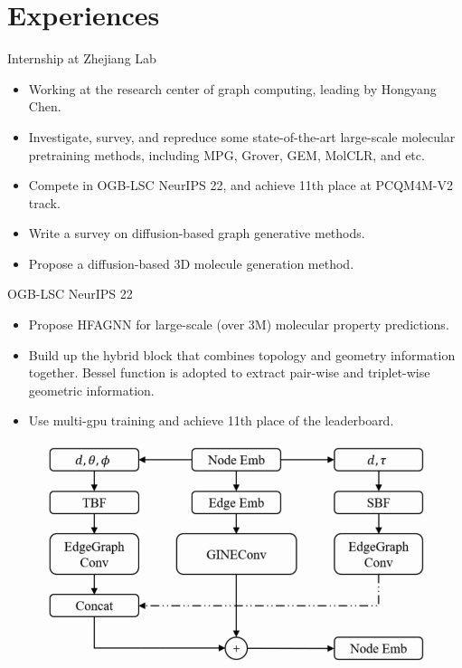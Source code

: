 \documentclass{beamer}
\begin{document}
\section{Experiences}
\begin{frame}{Internship at Zhejiang Lab}
    \begin{itemize}
        \item Working at the research center of graph computing, leading by Hongyang Chen.
        \item Investigate, survey, and repreduce some state-of-the-art large-scale molecular pretraining methods, including MPG, Grover, GEM, MolCLR, and etc.
        \item Compete in OGB-LSC NeurIPS 22, and achieve 11th place at PCQM4M-V2 track.
        \item Write a survey on diffusion-based graph generative methods.
        \item Propose a diffusion-based 3D molecule generation method.
    \end{itemize}
\end{frame}

\begin{frame}{OGB-LSC NeurIPS 22}
    \begin{itemize}
        \item Propose HFAGNN for large-scale (over 3M) molecular property predictions.
        \item Build up the hybrid block that combines topology and geometry information together. Bessel function is adopted to extract pair-wise and triplet-wise geometric information.
        \item Use multi-gpu training and achieve 11th place of the leaderboard. 
    \end{itemize}
    \begin{figure}[H]
        \centering
        \includegraphics[width=0.6\linewidth]{figure/hfagnn.png}
    \end{figure}
\end{frame}
\end{document}
